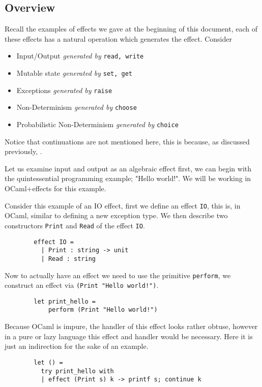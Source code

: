 \subsection{Overview}
\begin{example}
    Recall the examples of effects we gave at the beginning of this document,
    each of these effects has a natural operation which generates the effect.
    Consider
    \begin{itemize}
        \item Input/Output \textit{generated by} \texttt{read, write}
        \item Mutable state \textit{generated by} \texttt{set, get}
        \item Exceptions \textit{generated by} \texttt{raise}
        \item Non-Determinism \textit{generated by} \texttt{choose}
        \item Probabilistic Non-Determinism \textit{generated by} \texttt{choice}
    \end{itemize}
\end{example}

Notice that continuations are not mentioned here,
this is because, as discussed previously,
\cite{Plotkin:2002dw}\cite{hyland2007combining}.

Let us examine input and output as an algebraic effect first,
we can begin with the quintessential programming example;
"Hello world!".
We will be working in OCaml+effects for this example.\\

\begin{example}
    Consider this example of an IO effect,
    first we define an effect \texttt{IO},
    this is, in OCaml, similar to defining
    a new exception type.
    We then describe two constructors
    \texttt{Print} and \texttt{Read}
    of the effect \texttt{IO}.

    \begin{verbatim}
        effect IO =
          | Print : string -> unit
          | Read : string
    \end{verbatim}

    Now to actually have an effect we need to use the primitive \texttt{perform},
    we construct an effect via \texttt{(Print "Hello world!")}.

    \begin{verbatim}
        let print_hello =
            perform (Print "Hello world!")
    \end{verbatim}

    Because OCaml is impure, the handler of this effect looks rather obtuse,
    however in a pure or lazy language this effect and handler would be necessary.
    Here it is just an indirection for the sake of an example.

    \begin{verbatim}
        let () =
          try print_hello with
          | effect (Print s) k -> printf s; continue k
    \end{verbatim}
\end{example}

